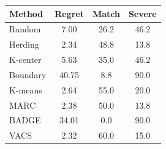 \begin{tabular}{lccc}
\toprule
Method & Regret & Match & Severe \\
\midrule
Random & 7.00 & 26.2 & 46.2 \\
Herding & 2.34 & 48.8 & 13.8 \\
K-center & 5.63 & 35.0 & 46.2 \\
Boundary & 40.75 & 8.8 & 90.0 \\
K-means & 2.64 & 55.0 & 20.0 \\
MARC & 2.38 & 50.0 & 13.8 \\
BADGE & 34.01 & 0.0 & 90.0 \\
VACS & 2.32 & 60.0 & 15.0 \\
\bottomrule
\end{tabular}
